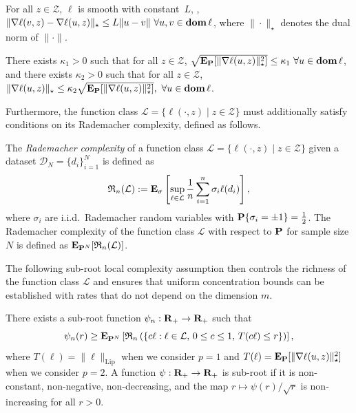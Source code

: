 \begin{assumption}[Smoothness]
\label{ass:smooth_intro}
For all $z \in \mathcal{Z}$, $\ell$ is smooth with constant~$L$,
\ie, $\|\nabla \ell(v,z) - \nabla \ell(u,z)\|_\star \leq L\| u - v\|~\forall u,v \in \mathop{\bf dom} \ell$, where $\|\cdot\|_\star$ denotes the dual norm of $\|\cdot\|$.
\end{assumption}

\begin{assumption}
\label{ass:grad_reg}
There exists $\kappa_1 > 0$ such that for all $z \in \mathcal{Z}$, 
$\sqrt{\mathbf{E}_{{\mathbf P}} [\|\nabla \ell(u,z)\|_\star^2]} \leq \kappa_1~\forall u \in \mathop{\bf dom} \ell$, and there exists $\kappa_2 > 0$ such that for all $z \in \mathcal{Z}$,
$\|\nabla \ell(u,z)\|_\star \leq \kappa_2 \sqrt{\mathbf{E}_{{\mathbf P}} [\|\nabla \ell(u,z)\|_\star^2]},~\forall u \in \mathop{\bf dom} \ell$. 
\end{assumption}

Furthermore, the function class $\mathcal{L}=\{\ell(\cdot,z)\mid z\in\mathcal{Z}\}$ must additionally satisfy conditions on its Rademacher complexity, defined as follows. 

\begin{definition}
\label{def:rad}
The \emph{Rademacher complexity} of a function class $\mathcal{L}=\{\ell(\cdot,z)\mid z\in\mathcal{Z}\}$ given a dataset $\mathcal{D}_N = \{d_i\}_{i=1}^N$ is defined as
\begin{equation*}
	\mathfrak{R}_n(\mathcal{L}) := \mathbf{E}_\sigma \left[ \sup_{\ell \in \mathcal{L}} \frac{1}{n} \sum_{i=1}^n \sigma_i \ell(d_i) \right],
\end{equation*}
where $\sigma_i$ are i.i.d.\ Rademacher random variables with ${\mathbf P}\{\sigma_i = \pm 1\} = \frac{1}{2}$.
The Rademacher complexity of the function class $\mathcal{L}$ with respect to ${\mathbf P}$ for sample size $N$ is defined as $\mathbf{E}_{{\mathbf P}^N}[\mathfrak{R}_n(\mathcal{L})]$.
\end{definition}

The following sub-root local complexity assumption then controls the richness of the function class $\mathcal{L}$ and ensures that uniform concentration bounds can be established with rates that do not depend on the dimension $m$.
\begin{assumption}
\label{ass:sub-root}
There exists a sub-root function $\psi_n : {\mathbf R}_+ \rightarrow {\mathbf R}_+$ such that
\begin{equation*}
	\psi_n(r) \geq \mathbf{E}_{{\mathbf P}^N} \left[ \mathfrak{R}_n\left( \left\{ c\ell : \ell \in \mathcal{L},\, 0 \leq c \leq 1,\, T(c\ell) \leq r \right\} \right) \right],
\end{equation*}
 where $T(\ell) = \|\ell\|_{\text{Lip}}$ when we consider $p=1$ and $T(\ell) = \mathbf{E}_{{\mathbf P}} [\|\nabla \ell(u,z)\|_\star^2]$ when we consider $p=2$.
 A function $\psi : {\mathbf R}_+ \rightarrow {\mathbf R}_+$ is sub-root if it is non-constant, non-negative, non-decreasing, and the map $r \mapsto \psi(r)/\sqrt{r}$ is non-increasing for all $r > 0$.
\end{assumption}

